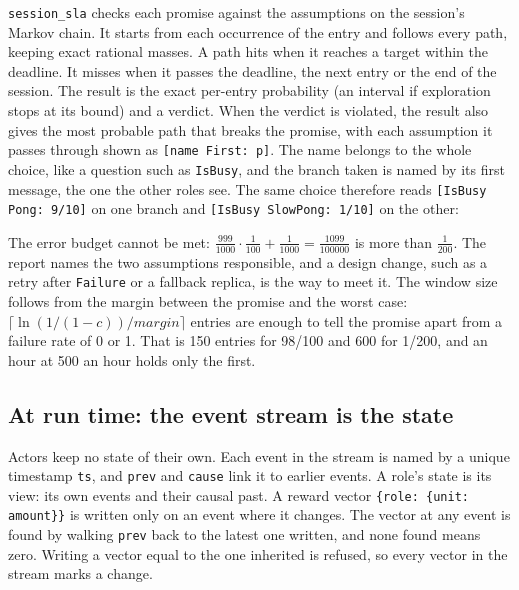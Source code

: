 \texttt{session\_sla} checks each promise against the assumptions on the
session's Markov chain. It starts from each occurrence of the entry and follows
every path, keeping exact rational masses. A path hits when it reaches a target
within the deadline. It misses when it passes the deadline, the next entry or
the end of the session. The result is the exact per-entry probability (an
interval if exploration stops at its bound) and a verdict. When the verdict is
violated, the result also gives the most probable path that breaks the promise,
with each assumption it passes through shown as
\texttt{[name \textrightarrow{} First: p]}. The name belongs to the whole choice, like a
question such as \texttt{IsBusy}, and the branch taken is named by its first message, the one the
other roles see. The same choice therefore reads \texttt{[IsBusy \textrightarrow{} Pong: 9/10]} on one
branch and \texttt{[IsBusy \textrightarrow{} SlowPong: 1/10]} on the other:



The error budget cannot be met: $\frac{999}{1000}\cdot\frac{1}{100} +
\frac{1}{1000} = \frac{1099}{100000}$ is more than $\frac{1}{200}$. The report
names the two assumptions responsible, and a design change, such as a retry
after \texttt{Failure} or a fallback replica, is the way to meet it. The
window size follows from the margin between the promise and the worst case:
$\lceil\ln(1/(1-c))/\textit{margin}\rceil$ entries are enough to tell the
promise apart from a failure rate of 0 or 1. That is 150 entries for 98/100
and 600 for 1/200, and an hour at 500 an hour holds only the first.

\subsection{At run time: the event stream is the state}

Actors keep no state of their own. Each event in the stream is named by a
unique timestamp \texttt{ts}, and \texttt{prev} and \texttt{cause} link it to
earlier events. A role's state is its view: its own events and their causal
past. A reward vector \texttt{\{role: \{unit: amount\}\}} is written only on an
event where it changes. The vector at any event is found by walking
\texttt{prev} back to the latest one written, and none found means zero.
Writing a vector equal to the one inherited is refused, so every vector in the
stream marks a change.

